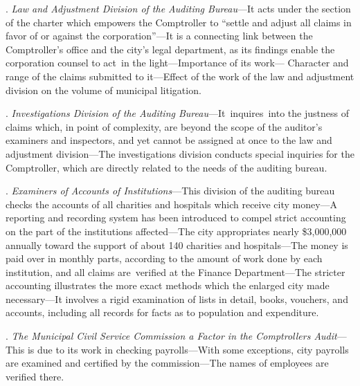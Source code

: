 \documentclass[twoside,symmetric,nobib,justified]{tufte-book}
\begin{document}
\vspace{.15in}

.\emph{ Law and Adjustment Division of the Auditing Bureau}---It acts
under the section of the charter which empowers the Comptroller to
``settle and adjust all claims in favor of or against the
corporation''---It is a connecting link between the Comptroller's office
and the city's legal department, as its findings enable the corporation
counsel to act~in the light---Importance of its work--- Character and
range of the claims submitted to it---Effect of the work of the law and
adjustment division on the volume of municipal litigation.~

\vspace{.15in}


. \emph{Investigations Division of the Auditing
Bureau}---It~inquires~into the justness of claims which, in point of
complexity, are beyond the scope of the auditor's examiners and
inspectors, and yet cannot be assigned at once to the law and adjustment
division---The investigations division conducts special inquiries for
the Comptroller, which are directly related to the needs of the auditing
bureau.~

\vspace{.15in}

. \emph{Examiners of Accounts of Institutions}---This division of the
auditing bureau checks the accounts of all charities and hospitals which
receive city money---A reporting and recording system has been
introduced to compel strict accounting on the part of the institutions
affected---The city appropriates nearly \$3,000,000 annually toward the
support of about 140 charities and hospitals---The money is paid over in
monthly parts, according to the amount of work done by each institution,
and all claims are~verified at the Finance Department---The stricter
accounting illustrates the more exact methods which the enlarged city
made necessary---It involves a rigid examination of lists in detail,
books, vouchers, and accounts, including all records for facts as to
population and expenditure.~

\vspace{.15in}

.\emph{ The Municipal Civil Service Commission a Factor in the
Comptroller\textquotesingle s Audit}---This is due to its work in
checking payrolls---With some exceptions, city payrolls are examined and
certified by the commission---The names of employees are verified there.
\end{document}
